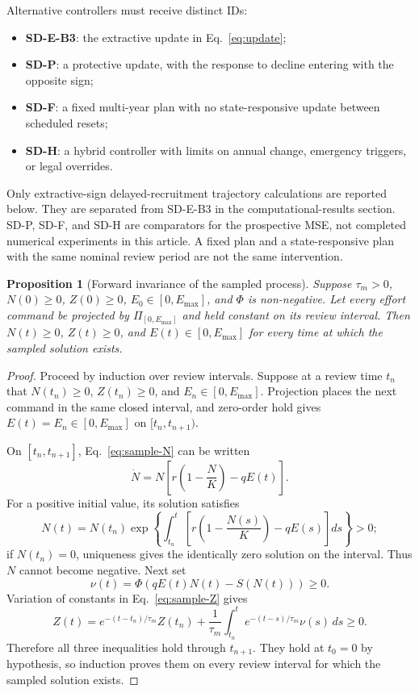 \documentclass[11pt]{article}
\newtheorem{proposition}{Proposition}
\begin{document}
Alternative controllers must receive distinct IDs:
\begin{itemize}
    \item \textbf{SD-E-B3}: the extractive update in Eq.~\eqref{eq:update};
    \item \textbf{SD-P}: a protective update, with the response to decline entering with the opposite sign;
    \item \textbf{SD-F}: a fixed multi-year plan with no state-responsive update between scheduled resets;
    \item \textbf{SD-H}: a hybrid controller with limits on annual change, emergency triggers, or legal overrides.
\end{itemize}
Only extractive-sign delayed-recruitment trajectory calculations are reported below. They are separated from SD-E-B3 in the computational-results section. SD-P, SD-F, and SD-H are comparators for the prospective MSE, not completed numerical experiments in this article. A fixed plan and a state-responsive plan with the same nominal review period are not the same intervention.

\begin{proposition}[Forward invariance of the sampled process]
Suppose $\tau_m>0$, $N(0)\ge0$, $Z(0)\ge0$, $E_0\in[0,E_{\max}]$, and $\Phi$ is non-negative. Let every effort command be projected by $\Pi_{[0,E_{\max}]}$ and held constant on its review interval. Then $N(t)\ge0$, $Z(t)\ge0$, and $E(t)\in[0,E_{\max}]$ for every time at which the sampled solution exists.
\end{proposition}

\begin{proof}
Proceed by induction over review intervals. Suppose at a review time $t_n$ that $N(t_n)\ge0$, $Z(t_n)\ge0$, and $E_n\in[0,E_{\max}]$. Projection places the next command in the same closed interval, and zero-order hold gives $E(t)=E_n\in[0,E_{\max}]$ on $[t_n,t_{n+1})$.

On $[t_n,t_{n+1}]$, Eq.~\eqref{eq:sample-N} can be written
\[
\dot N=N\left[r\left(1-\frac{N}{K}\right)-qE(t)\right].
\]
For a positive initial value, its solution satisfies
\[
N(t)=N(t_n)\exp\left\{
\int_{t_n}^{t}\left[r\left(1-\frac{N(s)}{K}\right)-qE(s)\right]ds
\right\}>0;
\]
if $N(t_n)=0$, uniqueness gives the identically zero solution on the interval. Thus $N$ cannot become negative. Next set
\[
\nu(t)=\Phi(qE(t)N(t)-S(N(t)))\ge0.
\]
Variation of constants in Eq.~\eqref{eq:sample-Z} gives
\[
Z(t)=e^{-(t-t_n)/\tau_m}Z(t_n)
 +\frac{1}{\tau_m}\int_{t_n}^{t}
 e^{-(t-s)/\tau_m}\nu(s)\,ds\ge0.
\]
Therefore all three inequalities hold through $t_{n+1}$. They hold at $t_0=0$ by hypothesis, so induction proves them on every review interval for which the sampled solution exists.
\end{proof}
\end{document}

